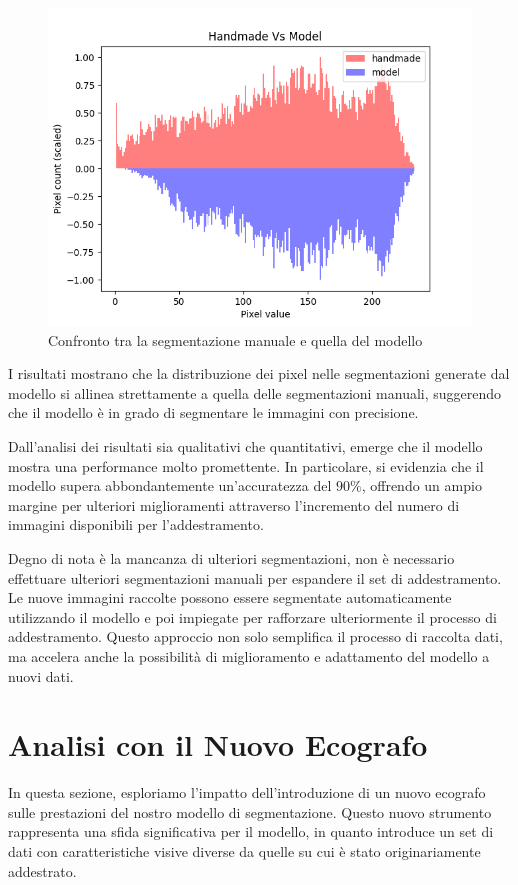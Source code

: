 \begin{figure}[!ht]
    \centering
    \includegraphics[width=0.7\columnwidth]{Immagini/handmade_vs_model_scaled.png}
    \caption{Confronto tra la segmentazione manuale e quella del modello}
    \label{fig:confronto tra la segmentazione manuale e quella del modello}
\end{figure}

I risultati mostrano che la distribuzione dei pixel nelle segmentazioni generate dal modello si
allinea strettamente a quella delle segmentazioni manuali, suggerendo che il modello è in grado di
segmentare le immagini con precisione.


Dall'analisi dei risultati sia qualitativi che quantitativi, emerge che il modello mostra una
performance molto promettente. In particolare, si evidenzia che il modello supera abbondantemente
un'accuratezza del $90\%$, offrendo un ampio margine per ulteriori miglioramenti attraverso
l'incremento del numero di immagini disponibili per l'addestramento.

Degno di nota è la mancanza di ulteriori segmentazioni, non è necessario effettuare ulteriori
segmentazioni manuali per espandere il set di addestramento. Le nuove immagini raccolte possono
essere segmentate automaticamente utilizzando il modello e poi impiegate per rafforzare
ulteriormente il processo di addestramento. Questo approccio non solo semplifica il processo di
raccolta dati, ma accelera anche la possibilità di miglioramento e adattamento del modello a nuovi
dati.


\section{Analisi con il Nuovo Ecografo}
\label{sec:analisi_nuovo_ecografo}

In questa sezione, esploriamo l'impatto dell'introduzione di un nuovo ecografo sulle prestazioni del
nostro modello di segmentazione. Questo nuovo strumento rappresenta una sfida significativa per il
modello, in quanto introduce un set di dati con caratteristiche visive diverse da quelle su cui è
stato originariamente addestrato.

